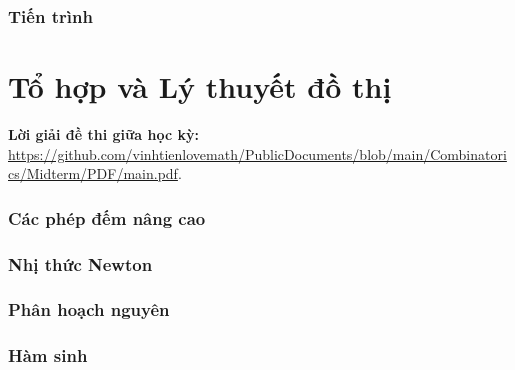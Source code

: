 \documentclass[12pt, a4paper, english]{article}
\begin{document}
  \tableofcontents
  \newpage

  \section*{Tiến trình}
    
  \newpage

  \part{Tổ hợp và Lý thuyết đồ thị}
    \textbf{Lời giải đề thi giữa học kỳ: }\url{https://github.com/vinhtienlovemath/PublicDocuments/blob/main/Combinatorics/Midterm/PDF/main.pdf}.
    
    \section{Các phép đếm nâng cao}
      
      
      
      
      
      
      
      
      
      
    \section{Nhị thức Newton}
      
      
      
    \section{Phân hoạch nguyên}
      
      
    \section{Hàm sinh}
      
\end{document}
